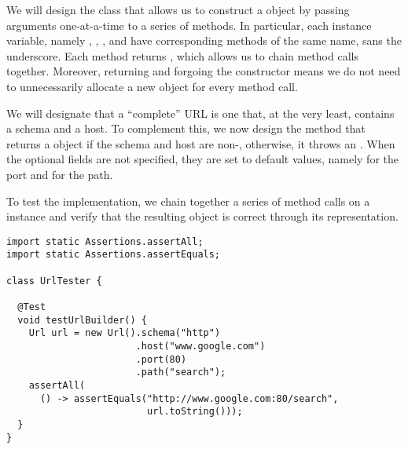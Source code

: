We will design the  class that allows us to construct a  object by passing arguments one-at-a-time to a series of methods. 
In particular, each instance variable, namely , , , and  have corresponding methods of the same name, sans the underscore. 
Each method returns , which allows us to chain method calls together. 
Moreover, returning  and forgoing the constructor means we do not need to unnecessarily allocate a new  object for every method call.

We will designate that a ``complete'' URL is one that, at the very least, contains a schema and a host. 
To complement this, we now design the  method that returns a  object if the schema and host are non-, otherwise, it throws an . When the optional fields are not specified, they are set to default values, namely  for the port and  for the path.

To test the implementation, we chain together a series of method calls on a  instance and verify that the resulting  object is correct through its  representation.

\begin{lstlisting}[language=MyJava]
import static Assertions.assertAll;
import static Assertions.assertEquals;

class UrlTester {

  @Test
  void testUrlBuilder() {
    Url url = new Url().schema("http")
                       .host("www.google.com")
                       .port(80)
                       .path("search");
    assertAll(
      () -> assertEquals("http://www.google.com:80/search", 
                         url.toString()));
  }
}
\end{lstlisting}

